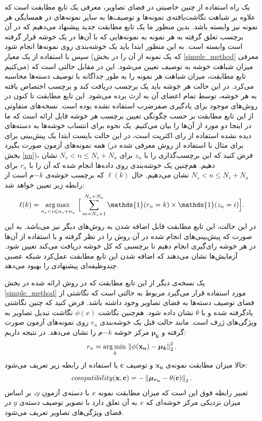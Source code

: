 یک راه استفاده از چنین خاصیتی در فضای تصاویر، معرفی یک تابع مطابقت است که علاوه بر شباهت نگاشت‌یافته‌ی نمونه‌ها و توصیف‌ها به سایر نمونه‌های در همسایگی هر نمونه نیز وابسته باشد. بدین منظور ما یک تابع مطابقت جدید پیشنهاد می‌دهیم که در آن برچسب تعلق گرفته به هر نمونه به نمونه‌هایی که با آن‌ها در یک خوشه قرار گرفته است وابسته است. به این منظور ابتدا باید یک خوشه‌بندی روی نمونه‌ها انجام شود سپس با استفاده از یک معیار (که یک نمونه از آن را در بخش \ref{simple_method} معرفی می‌کنیم) میزان شباهت خوشه به توصیف تعیین می‌شود. این در مقابل حالتی است که تابع مطابقت، میزان شباهت هر نمونه را به طور جداگانه با توصیف دسته‌ها محاسبه می‌کرد.  در این حالت هر خوشه باید یک برچسب دریافت کند و برچسب اختصاص یافته به هر خوشه، توسط تمام اعضای آن به ارث برده می‌شود. این تابع مطابقت تا کنون در روش‌های موجود برای یادگیری صفرضرب استفاده نشده بوده است. نسخه‌های متفاوتی از این تابع مطابقت بر حسب چگونگی تعیین برچسب هر خوشه قابل ارائه است که ما در اینجا دو مورد از آن‌ها را بیان می‌کنیم.
یک نحوه برای انتساب خوشه‌ها به دسته‌های دیده نشده استفاده از رای اکثریت است، در این حالت بایست ابتدا یک پیش‌بینی برای همه نمونه‌های آزمون صورت بگیرد (برای مثال با استفاده از روش معرفی شده در بخش \ref{nn})، فرض کنید که این برچسب‌گذاری را با
$z_n$
برای
 $N_s < n \leq N_s + N_u$
نشان دهیم. هم‌چنین یک خوشه‌بندی روی داده‌ها انجام شده که آن را با
$r_n$ برای
$N_s < n \leq N_s + N_u$
نشان می‌دهیم. حال   $\ell(k)$ که برچسب خوشه‌ی $-k$م است از رابطه زیر تعیین خواهد شد:
\begin{equation}
\label{eq:voting}
\ell(k) = \argmax_{n_s < i \leq n_s + n_u} \, \Big [ \sum_{m=N_s+1}^{N_s+N_u} \mathds{1}(r_n = k) \times \mathds{1}(z_n = i) \Big ].
\end{equation}
در این حالت،
 این تابع مطابقت قابل اضافه شدن به روش‌های دیگر نیز می‌باشد. به این صورت که پیش‌بینی‌های انجام شده در آن روش را در نظر گرفته و با استفاده از آن‌ها در هر خوشه رای‌گیری انجام دهیم تا برچسبی که کل خوشه دریافت می‌کند تعیین شود. آزمایش‌ها نشان می‌دهند که  اضافه شدن این تابع مطابقت عمل‌کرد شبکه عصبی چندوظیفه‌ای پیشنهادی را بهبود می‌دهد.

 یک نسخه‌ی دیگر از این تابع مطابقت که در روش ارائه شده در بخش \ref{simple_method} مورد استفاده قرار می‌گیرد مربوط به حالتی است که نگاشتی از فضای توصیف دسته‌ها به فضای تصاویر وجود داشته باشد. فرض کنید که چنین نگاشتی یادگرفته شده و با $\theta$ نشان داده شود. هم‌چنین نگاشت
 $\phi(x)$
  نگاشت تبدیل تصاویر به ویژگی‌های ژرف است. مانند حالت قبل یک خوشه‌بندی $r_n$ روی نمونه‌های آزمون صورت گرفته و
   $\boldsymbol{\mu_k} $
    مرکز خوشه $-k$م را نشان می‌دهد. در نتیجه داریم:
 \begin{equation}
 r_n = \operatorname*{arg\,min\,}_{k} \left \lVert \phi(\mathbf{x_n}) - \boldsymbol{\mu_k} \right \rVert_2^2.
 \end{equation}
 حالا میزان مطابقت نمونه‌ی $\mathbf{x_n} $ و توصیف $\mathbf{c} $ با استفاده از رابطه زیر تعریف می‌شود:
 \begin{equation}
 compatibility(\mathbf{x,c}) = - \left \lVert \boldsymbol{\mu_{r_n}} -  \theta(\mathbf{c}) \right \rVert_2.
 \end{equation}
 تعبیر رابطه فوق این است که میزان مطابقت نمونه $x$ با دسته‌ی آزمون $y$، بر اساس میزان نزدیکی مرکز خوشه‌ای که $x$ به آن تعلق دارد با تصویر توصیف دسته‌ی $y$ در فضای ویژگی‌های تصاویر تعریف می‌شود.


